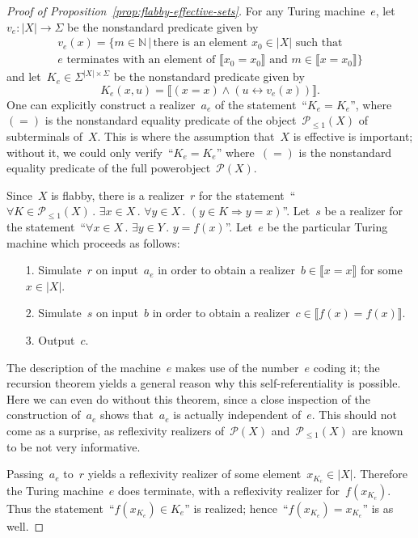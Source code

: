 \documentclass[oneside]{amsart}
\theoremstyle{definition}
\theoremstyle{plain}
\theoremstyle{remark}
\newcommand{\NN}{\mathbb{N}}
\renewcommand{\P}{\mathcal{P}}
\renewcommand{\_}{\mathpunct{.}\,}
\newcommand{\effective}{ef{}fective\xspace}
\begin{document}
\begin{proof}[Proof of Proposition~\ref{prop:flabby-effective-sets}]
For any Turing machine~$e$, let~$v_e : |X| \to \Sigma$ be the nonstandard
predicate given by
\begin{multline*}
  v_e(x) = \{ m \in \NN \,|\,
  \text{there is an element~$x_0 \in |X|$ such that} \\
  \text{$e$ terminates with an element of~$\llbracket x_0 = x_0 \rrbracket$ and
  $m \in \llbracket x = x_0 \rrbracket$} \}
\end{multline*}
and let~$K_e \in \Sigma^{|X| \times \Sigma}$ be the nonstandard predicate given by
\[ K_e(x,u) = \llbracket (x = x) \wedge (u \leftrightarrow v_e(x)) \rrbracket. \]
One can explicitly construct a realizer~$a_e$ of the statement~``$K_e = K_e$'',
where~$({=})$ is the nonstandard equality predicate of the object~$\P_{\leq1}(X)$
of subterminals of~$X$. This is where the assumption that~$X$ is \effective is
important; without it, we could only verify~``$K_e = K_e$'' where~$({=})$ is
the nonstandard equality predicate of the full powerobject~$\P(X)$.

Since~$X$ is flabby, there is a realizer~$r$ for the statement~``$\forall K \in
\P_{\leq1}(X)\_ \exists x \in X\_ \forall y \in X\_ (y \in K \Rightarrow y =
x)$''. Let~$s$ be a realizer for the statement~``$\forall x \in X\_ \exists y
\in Y\_ y = f(x)$''. Let~$e$ be the particular Turing machine which proceeds as
follows:
\begin{enumerate}
\item[1.] Simulate~$r$ on input~$a_e$ in order to obtain a realizer~$b \in
\llbracket x = x \rrbracket$ for some~$x \in |X|$.
\item[2.] Simulate~$s$ on input~$b$ in order to obtain a realizer~$c \in \llbracket
f(x) = f(x) \rrbracket$.
\item[3.] Output~$c$.
\end{enumerate}
The description of the machine~$e$ makes use of the number~$e$ coding it;
the recursion theorem yields a general reason why this self-referentiality is
possible. Here we can even do without this theorem, since a close inspection of
the construction of~$a_e$ shows that~$a_e$ is actually independent of~$e$. This
should not come as a surprise, as reflexivity realizers of~$\P(X)$
and~$\P_{\leq1}(X)$ are known to be not very informative.

Passing~$a_e$ to~$r$ yields a reflexivity realizer of some element~$x_{K_e} \in
|X|$. Therefore the Turing machine~$e$ does terminate, with a reflexivity
realizer for~$f(x_{K_e})$. Thus the statement~``$f(x_{K_e}) \in K_e$'' is
realized; hence~``$f(x_{K_e}) = x_{K_e}$'' is as well.
\end{proof}
\end{document}
